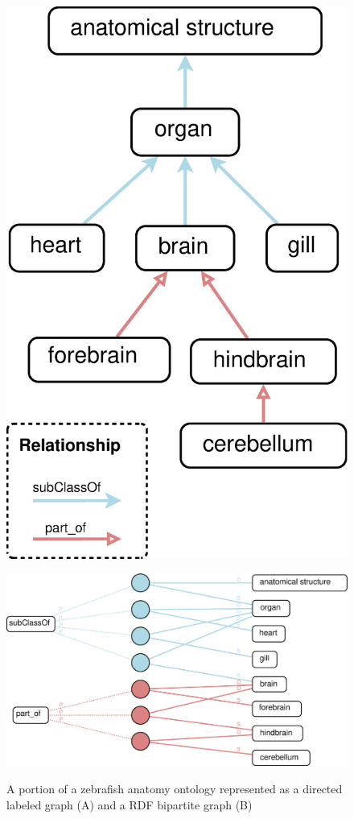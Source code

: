 \begin{figure}[tbh]
\centering
\begin{minipage}[c]{0.35\textwidth}\flushright
\includegraphics[width=.7\textwidth]{fig/DLG-bio.eps}
\end{minipage}\hfill
\begin{minipage}[c]{0.6\textwidth}\centering
\includegraphics[width=\textwidth]{fig/BG-bio.eps}\\
\end{minipage}
\caption{\label{fig:graphcomp-bio} A portion of a zebrafish anatomy ontology represented as a directed labeled graph (A) and a RDF bipartite graph (B)}
\end{figure}

